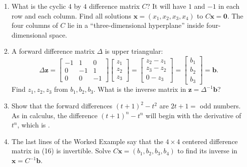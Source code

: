 \documentclass[14pt, a4paper]{article}
\begin{document}
\begin{enumerate}
    \item What is the cyclic $4$ by $4$ difference matrix $C$? It will have $1$ and $-1$ in each row and each column. Find all solutions $\boldsymbol{x} = (x_1, x_2, x_3, x_4)$ to $C\boldsymbol{x} = \boldsymbol{0}$. The four columns of $C$ lie in a ``three-dimensional hyperplane'' inside four-dimensional space.

    \item A forward difference matrix $\Delta$ is upper triangular:
          \[
              \Delta \boldsymbol{z} =
              \begin{bmatrix}
                  -1 & 1  & 0  \\
                  0  & -1 & 1  \\
                  0  & 0  & -1
              \end{bmatrix}
              \begin{bmatrix}
                  z_1 \\ z_2 \\ z_3
              \end{bmatrix}
              =
              \begin{bmatrix}
                  z_2 - z_1 \\ z_3 - z_2 \\ 0 - z_3
              \end{bmatrix}
              =
              \begin{bmatrix}
                  b_1 \\ b_2 \\ b_3
              \end{bmatrix}
              = \boldsymbol{b}.
          \]
          Find $z_1, z_2, z_3$ from $b_1, b_2, b_3$. What is the inverse matrix in $\boldsymbol{z} = \Delta^{-1}\boldsymbol{b}$?

    \item Show that the forward differences $(t+1)^2 - t^2$ are $2t+1 =$ odd numbers. As in calculus, the difference $(t+1)^n - t^n$ will begin with the derivative of $t^n$, which is \underline{\hspace{3cm}}.

    \item The last lines of the Worked Example say that the $4 \times 4$ centered difference matrix in (16) is invertible. Solve $C\boldsymbol{x} = ( b_1, b_2, b_3, b_4) $ to find its inverse in $\boldsymbol{x} = C^{-1}\boldsymbol{b}$.
\end{enumerate}
\end{document}
